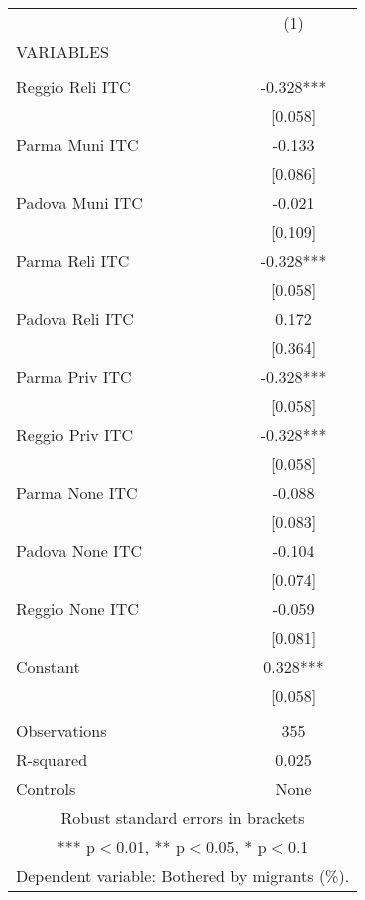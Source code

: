 \begin{tabular}{lc} \hline
 & (1) \\
VARIABLES &  \\ \hline
 &  \\
Reggio Reli ITC & -0.328*** \\
 & [0.058] \\
Parma Muni ITC & -0.133 \\
 & [0.086] \\
Padova Muni ITC & -0.021 \\
 & [0.109] \\
Parma Reli ITC & -0.328*** \\
 & [0.058] \\
Padova Reli ITC & 0.172 \\
 & [0.364] \\
Parma Priv ITC & -0.328*** \\
 & [0.058] \\
Reggio Priv ITC & -0.328*** \\
 & [0.058] \\
Parma None ITC & -0.088 \\
 & [0.083] \\
Padova None ITC & -0.104 \\
 & [0.074] \\
Reggio None ITC & -0.059 \\
 & [0.081] \\
Constant & 0.328*** \\
 & [0.058] \\
 &  \\
Observations & 355 \\
R-squared & 0.025 \\
 Controls & None \\ \hline
\multicolumn{2}{c}{ Robust standard errors in brackets} \\
\multicolumn{2}{c}{ *** p$<$0.01, ** p$<$0.05, * p$<$0.1} \\
\multicolumn{2}{c}{ Dependent variable: Bothered by migrants (\%).} \\
\end{tabular}
